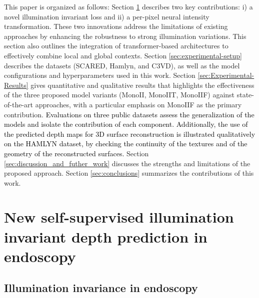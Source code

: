 \documentclass[a4paper,fleqn]{cas-dc}
\begin{document}
This paper is organized as follows: Section \ref{sec:methods_and_data} describes two key contributions: i) a novel illumination invariant loss and ii) a per-pixel neural intensity transformation. These two innovations address the limitations of existing approaches by enhancing the robustness to strong illumination variations. This section also outlines the integration of transformer-based architectures to effectively combine local and global contexts. Section \ref{sec:experimental-setup} describes the datasets (SCARED, Hamlyn, and C3VD), as well as the model configurations and hyperparameters used in this work. Section \ref{sec:Experimental-Results} gives quantitative and qualitative results that highlights the effectiveness of the three proposed model variants (MonoII, MonoIIT, MonoIIF) against state-of-the-art approaches, with a particular emphasis on MonoIIF as the primary contribution. \textcolor{black}{Evaluations on three public datasets assess the generalization of the models and isolate the contribution of each component. Additionally, the use of the predicted depth maps for 3D surface reconstruction is illustrated qualitatively on the HAMLYN dataset, by checking the continuity of the textures and of the geometry of the reconstructed surfaces.} Section \ref{sec:discussion_and_futher_work} discusses the strengths and limitations of the proposed approach. Section \ref{sec:conclusions} summarizes the contributions of this work. 

\section{New self-supervised illumination invariant
 depth prediction in endoscopy}
\label{sec:methods_and_data}

\subsection{Illumination invariance in endoscopy \label{sec:illumination_models}}
\end{document}
